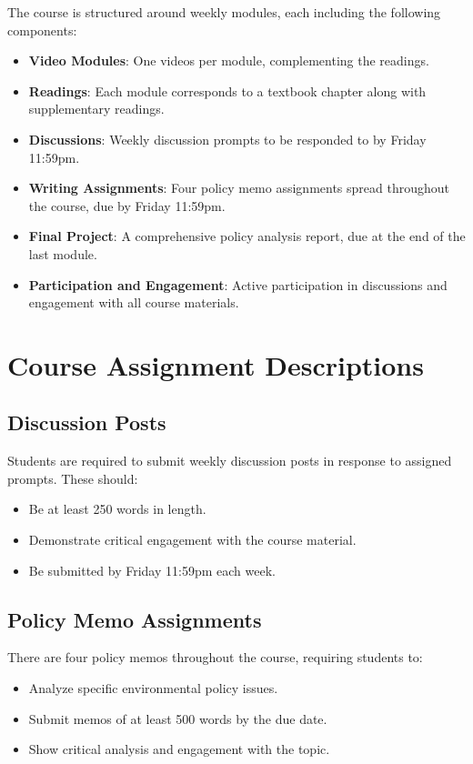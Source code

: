 \documentclass[12pt, letterpaper]{article}
\begin{document}
The course is structured around weekly modules, each including the following components:
\begin{itemize}
    \item \textbf{Video Modules}: One videos per module, complementing the readings.
    \item \textbf{Readings}: Each module corresponds to a textbook chapter along with supplementary readings.
    \item \textbf{Discussions}: Weekly discussion prompts to be responded to by Friday 11:59pm.
    \item \textbf{Writing Assignments}: Four policy memo assignments spread throughout the course, due by Friday 11:59pm.
    \item \textbf{Final Project}: A comprehensive policy analysis report, due at the end of the last module.
    \item \textbf{Participation and Engagement}: Active participation in discussions and engagement with all course materials.
\end{itemize}

\section*{Course Assignment Descriptions}

\subsection*{Discussion Posts}
Students are required to submit weekly discussion posts in response to assigned prompts. These should:
\begin{itemize}
    \item Be at least 250 words in length.
    \item Demonstrate critical engagement with the course material.
    \item Be submitted by Friday 11:59pm each week.
\end{itemize}

\subsection*{Policy Memo Assignments}
There are four policy memos throughout the course, requiring students to:
\begin{itemize}
    \item Analyze specific environmental policy issues.
    \item Submit memos of at least 500 words by the due date.
    \item Show critical analysis and engagement with the topic.
\end{itemize}
\end{document}
